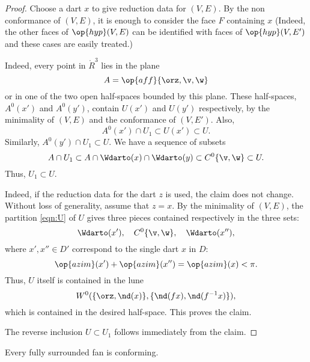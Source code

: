 \begin{proof}
  Choose a dart $x$ to give reduction data for $(V,E)$.  By the non
  conformance of $(V,E)$, it is enough to consider the face $F$
  containing $x$ (Indeed, the other faces of $\op{hyp}(V,E)$ can be
  identified with faces of $\op{hyp}(V,E')$ and these cases are easily
  treated.)  

    Indeed, every point in
  $\ring{R}^3$ lies in the plane
\[ 
A=\op{aff}\{\orz,\v,\w\}
\] 
or in one of the two open half-spaces bounded by this plane.  These
half-spaces, $A^0(x')$ and $A^0(y')$, contain $U(x')$ and $U(y')$
respectively, by the minimality of $(V,E)$ and the conformance of $(V,E')$.  Also,
\[ 
A^0(x')\cap U_1 \subset U(x')\subset U.
\] 
Similarly, $A^0(y')\cap U_1 \subset U$.  We have a sequence of subsets
\[ 
A \cap U_1 \subset A \cap \Wdarto(x) \cap \Wdarto(y) \subset C^0\{\v,\w\} \subset U.
\] 
Thus,
$U_1\subset U$.

 Indeed,
if the reduction data for the dart $z$ is used, the claim does not change.
Without loss of generality, assume that $z=x$.  By the minimality of $(V,E)$, the
partition \eqref{eqn:U} of $U$ gives three pieces contained respectively
in the three sets:
\[ 
\Wdarto(x'),\quad C^0\{\v,\w\},\quad \Wdarto(x''),
\] 
where $x',x''\in D'$ correspond to the single dart $x$ in $D$:
\[ 
\op{azim}(x') + \op{azim}(x'') = \op{azim}(x) < \pi.
\] 
Thus, $U$ itself is contained in the lune
\[ 
W^0(\{\orz,\nd(x)\},\{\nd(f x),\nd(f^{-1} x)\}),
\] 
which is contained in the desired half-space.  This proves the claim.

The reverse inclusion $U\subset U_1$ follows immediately from the claim.
\end{proof}

%


\begin{lemma}[conformance]\label{lemma:face}
Every fully surrounded fan is conforming.
\end{lemma}

